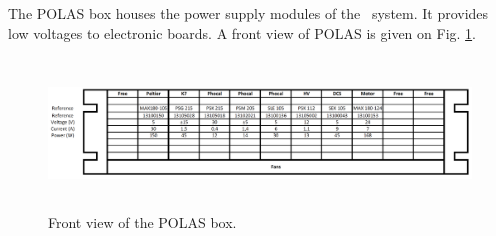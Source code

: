 The POLAS box houses the power supply modules of the \las~system. It provides low voltages to electronic boards. A front view of POLAS is given on Fig. \ref{fig:laspolas}.

\begin{figure}[htbp]
\centering
\includegraphics[height=4cm,width=18cm]{figures/polas_faceavant.pdf}
\caption{Front view of the POLAS box.}\label{fig:laspolas}
\end{figure}